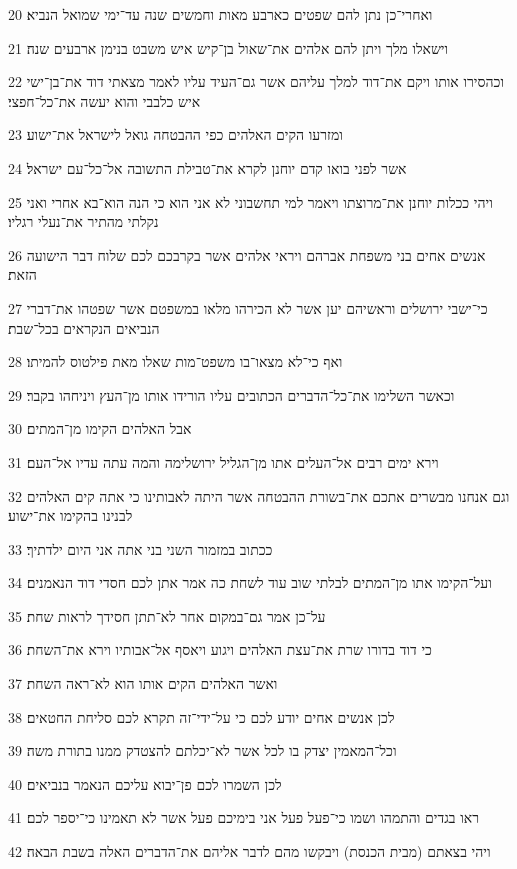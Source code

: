 \par 20 ואחרי־כן נתן להם שפטים כארבע מאות וחמשים שנה עד־ימי שמואל הנביא׃
\par 21 וישאלו מלך ויתן להם אלהים את־שאול בן־קיש איש משבט בנימן ארבעים שנה׃
\par 22 וכהסירו אותו ויקם את־דוד למלך עליהם אשר גם־העיד עליו לאמר מצאתי דוד את־בן־ישי איש כלבבי והוא יעשה את־כל־חפצי׃
\par 23 ומזרעו הקים האלהים כפי ההבטחה גואל לישראל את־ישוע׃
\par 24 אשר לפני בואו קדם יוחנן לקרא את־טבילת התשובה אל־כל־עם ישראל׃
\par 25 ויהי ככלות יוחנן את־מרוצתו ויאמר למי תחשבוני לא אני הוא כי הנה הוא־בא אחרי ואני נקלתי מהתיר את־נעלי רגליו׃
\par 26 אנשים אחים בני משפחת אברהם ויראי אלהים אשר בקרבכם לכם שלוח דבר הישועה הזאת׃
\par 27 כי־ישבי ירושלים וראשיהם יען אשר לא הכירהו מלאו במשפטם אשר שפטהו את־דברי הנביאים הנקראים בכל־שבת׃
\par 28 ואף כי־לא מצאו־בו משפט־מות שאלו מאת פילטוס להמיתו׃
\par 29 וכאשר השלימו את־כל־הדברים הכתובים עליו הורידו אותו מן־העץ ויניחהו בקבר׃
\par 30 אבל האלהים הקימו מן־המתים׃
\par 31 וירא ימים רבים אל־העלים אתו מן־הגליל ירושלימה והמה עתה עדיו אל־העם׃
\par 32 וגם אנחנו מבשרים אתכם את־בשורת ההבטחה אשר היתה לאבותינו כי אתה קים האלהים לבנינו בהקימו את־ישוע׃
\par 33 ככתוב במזמור השני בני אתה אני היום ילדתיך׃
\par 34 ועל־הקימו אתו מן־המתים לבלתי שוב עוד לשחת כה אמר אתן לכם חסדי דוד הנאמנים׃
\par 35 על־כן אמר גם־במקום אחר לא־תתן חסידך לראות שחת׃
\par 36 כי דוד בדורו שרת את־עצת האלהים ויגוע ויאסף אל־אבותיו וירא את־השחת׃
\par 37 ואשר האלהים הקים אותו הוא לא־ראה השחת׃
\par 38 לכן אנשים אחים יודע לכם כי על־ידי־זה תקרא לכם סליחת החטאים׃
\par 39 וכל־המאמין יצדק בו לכל אשר לא־יכלתם להצטדק ממנו בתורת משה׃
\par 40 לכן השמרו לכם פן־יבוא עליכם הנאמר בנביאים׃
\par 41 ראו בגדים והתמהו ושמו כי־פעל פעל אני בימיכם פעל אשר לא תאמינו כי־יספר לכם׃
\par 42 ויהי בצאתם (מבית הכנסת) ויבקשו מהם לדבר אליהם את־הדברים האלה בשבת הבאה׃
